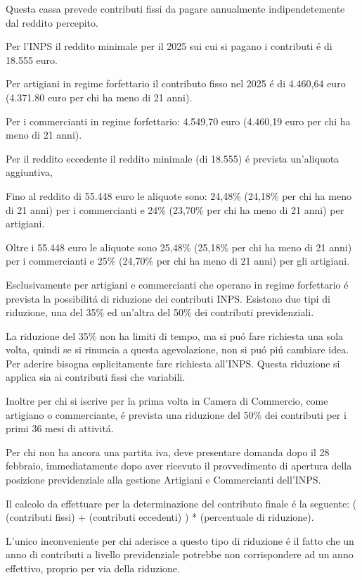 \documentclass{article}
\begin{document}
Questa cassa prevede contributi fissi da pagare annualmente indipendetemente dal reddito percepito.

Per l'INPS il reddito minimale per il 2025 sui cui si pagano i contributi \'e di 18.555 euro. 

Per artigiani in regime forfettario il contributo fisso nel 2025 \'e di 4.460,64 euro (4.371.80 euro per chi ha meno di 21 anni).

Per i commercianti in regime forfettario: 4.549,70 euro (4.460,19 euro per chi ha meno di 21 anni).

Per il reddito eccedente il reddito minimale (di 18.555) \'e prevista un'aliquota aggiuntiva,

Fino al reddito di 55.448 euro le aliquote sono: 24,48\% (24,18\% per chi ha meno di 21 anni) per i commercianti e 24\% (23,70\% per chi ha meno di 21 anni) per artigiani. 

Oltre i 55.448 euro le aliquote sono 25,48\% (25,18\% per chi ha meno di 21 anni) per i commercianti e 25\% (24,70\% per chi ha meno di 21 anni) per gli artigiani. 

Esclusivamente per artigiani e commercianti che operano in regime forfettario \'e prevista la possibilit\'a di riduzione dei contributi INPS. Esistono due tipi di riduzione, una del 35\% ed un'altra del 50\% dei contributi previdenziali.

La riduzione del 35\% non ha limiti di tempo, ma si pu\'o fare richiesta una sola volta, quindi se si rinuncia a questa agevolazione, non si pu\'o pi\'u cambiare idea. Per aderire bisogna esplicitamente fare richiesta all'INPS. Questa riduzione si applica sia ai contributi fissi che variabili.

Inoltre per chi si iscrive per la prima volta in Camera di Commercio, come artigiano o commerciante, \'e prevista una riduzione del 50\% dei contributi per i primi 36 mesi di attivit\'a.

Per chi non ha ancora una partita iva, deve presentare domanda dopo il 28 febbraio, immediatamente dopo aver ricevuto il provvedimento di apertura della posizione previdenziale alla gestione Artigiani e Commercianti dell'INPS.

Il calcolo da effettuare per la determinazione del contributo finale \'e la seguente: ( (contributi fissi) + (contributi eccedenti) ) * (percentuale di riduzione). 

L'unico inconveniente per chi aderisce a questo tipo di riduzione \'e il fatto che un anno di contributi a livello previdenziale potrebbe non corrispondere ad un anno effettivo, proprio per via della riduzione.
\end{document}
